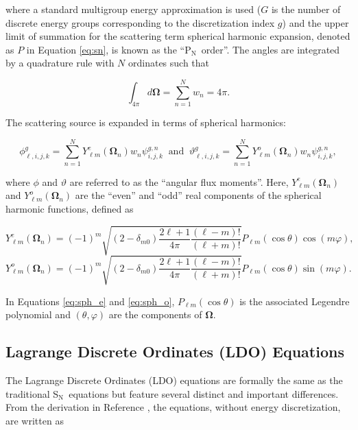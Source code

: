 \documentclass{article} %
\newcommand{\bo}{\mathbf\Omega}
\newcommand{\sn}{S$_\mathrm{N}$}
\newcommand{\pn}{P$_\mathrm{N}$}
\newcommand{\Ye}[2]{\ensuremath{Y^e_{#1}(\bo_#2)}}
\newcommand{\Yo}[2]{\ensuremath{Y^o_{#1}(\bo_#2)}}
\begin{document}
\noindent where a standard multigroup energy approximation is used ($G$ is the
number of discrete energy groups corresponding to the discretization index
$g$) and the  upper limit of summation for the scattering term spherical
harmonic expansion, denoted as $P$ in Equation \ref{eq:sn}, is known as the
``\pn\ order''. The angles are integrated by a quadrature rule with $N$
ordinates such that

\begin{equation}
\int_{4\pi} d\bo = \sum_{n=1}^{N}w_n = 4\pi.
\label{eq:quadrule}
\end{equation}

\noindent The scattering source is expanded in terms of spherical harmonics:

\begin{equation}
\phi_{\ell,i,j,k}^{g}=\sum_{n=1}^N \Ye{\ell m}{n}w_n\psi^{g,n}_{i,j,k}\ \text{ and }\
\vartheta_{\ell,i,j,k}^{g} = \sum_{n=1}^N \Yo{\ell m}{n}w_n\psi^{g,n}_{i,j,k},
\label{sph_harm_exp}
\end{equation}

\noindent where $\phi$ and $\vartheta$ are referred to as the ``angular flux
moments''. Here, $\Ye{\ell m}{n}$ and $\Yo{\ell m}{n}$ are the ``even'' and
``odd'' real components of the spherical harmonic functions, defined as
\cite{exmm}

\begin{equation}
\Ye{\ell m}{n} = (-1)^m\sqrt{(2-\delta_{m0})\frac{2\ell+1}{4\pi}
                       \frac{(\ell-m)!}{(\ell+m)!}}
                       P_{\ell m}(\cos\theta)\cos(m\varphi),
\label{eq:sph_e}
\end{equation}
\begin{equation}
\Yo{\ell m}{n} = (-1)^m\sqrt{(2-\delta_{m0})\frac{2\ell+1}{4\pi}
                       \frac{(\ell-m)!}{(\ell+m)!}}
                       P_{\ell m}(\cos\theta)\sin(m\varphi).
\label{eq:sph_o}
\end{equation}

\noindent In Equations \ref{eq:sph_e} and \ref{eq:sph_o},
$P_{\ell m}(\cos\theta)$ is the associated Legendre polynomial and
$(\theta,\varphi)$ are the components of $\bo$.

\subsection{Lagrange Discrete Ordinates (LDO) Equations}

The Lagrange Discrete Ordinates (LDO) equations are formally the same as the
traditional \sn\ equations but feature several distinct and important
differences. From the derivation in Reference \cite{ahrens}, the equations,
without energy discretization, are written as
\end{document}
